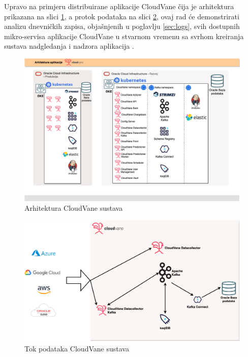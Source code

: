 \documentclass[times, utf8, diplomski]{fer}
\begin{document}
Upravo na primjeru distribuirane aplikacije CloudVane čija je arhitektura prikazana na slici \ref{fig:cloudvaneArch}, a protok podataka na slici \ref{fig:dataCloudvane}, ovaj rad će demonstrirati analizu dnevničkih zapisa, objašnjenih u poglavlju \ref{sec:logs}, svih dostupnih mikro-servisa aplikacije CloudVane u stvarnom vremenu  sa svrhom kreiranja sustava nadgledanja i nadzora aplikacija .

\begin{figure}[htb]
	\centering
	\includegraphics[width=15cm]{images/CloudVaneArchitecture.png}
	\caption[Arhitektura CloudVane sustava]{Arhitektura CloudVane sustava}
	\label{fig:cloudvaneArch}
\end{figure}

\begin{figure}[htb]
	\centering
	\includegraphics[width=15cm]{images/CloudVaneData.png}
	\caption[Tok podataka CloudVane sustava]{Tok podataka  CloudVane sustava}
	\label{fig:dataCloudvane}
\end{figure}
\end{document}

